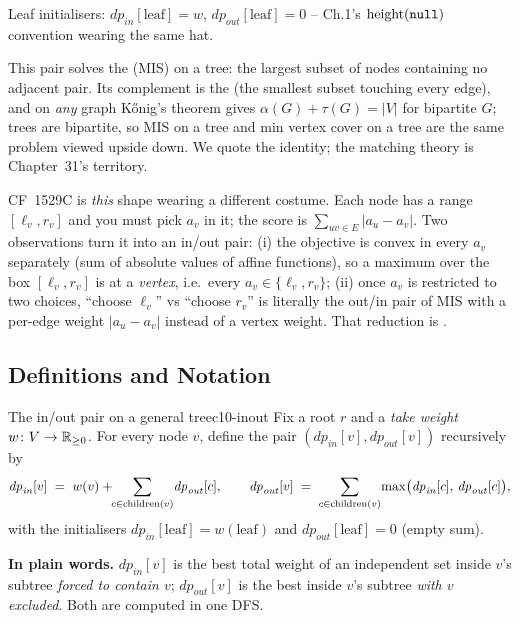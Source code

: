 Leaf initialisers: $\mathit{dp}_{\mathit{in}}[\text{leaf}]=w$,
$\mathit{dp}_{\mathit{out}}[\text{leaf}]=0$ -- Ch.1's $\operatorname{height}(\texttt{null})$
convention wearing the same hat.

This pair solves the  (MIS) on a tree: the
largest subset of nodes containing no adjacent pair. Its complement is the
 (the smallest subset touching every edge), and
on \emph{any} graph K{\H{o}}nig's theorem gives
$\alpha(G)+\tau(G)=|V|$ for bipartite $G$; trees are bipartite, so MIS on a
tree and min vertex cover on a tree are the same problem viewed upside
down. We quote the identity; the matching theory is Chapter~31's territory.

CF~1529C is \emph{this} shape wearing a different costume. Each node has a
range $[\ell_v,r_v]$ and you must pick $a_v$ in it; the score is
$\sum_{uv\in E}|a_u-a_v|$. Two observations turn it into an in/out pair:
(i) the objective is convex in every $a_v$ separately (sum of absolute
values of affine functions), so a maximum over the box $[\ell_v,r_v]$ is at
a \emph{vertex}, i.e.\ every $a_v\in\{\ell_v,r_v\}$; (ii) once $a_v$ is
restricted to two choices, ``choose $\ell_v$'' vs ``choose $r_v$'' is
literally the out/in pair of MIS with a per-edge weight $|a_u-a_v|$ instead
of a vertex weight. That reduction is .

\subsection{Definitions and Notation}

\begin{definition}{The in/out pair on a general tree}{c10-inout}
Fix a root $r$ and a \emph{take weight} $w\colon V\to\mathbb{R}_{\ge 0}$. For every
node $v$, define the pair $(\mathit{dp}_{\mathit{in}}[v],
\mathit{dp}_{\mathit{out}}[v])$ recursively by
\[
  \mathit{dp}_{\mathit{in}}[v] \;=\; w(v)+\!\!\sum_{c\in\operatorname{children}(v)}\!\mathit{dp}_{\mathit{out}}[c],
  \qquad
  \mathit{dp}_{\mathit{out}}[v] \;=\; \sum_{c\in\operatorname{children}(v)}\!\max\!\big(\mathit{dp}_{\mathit{in}}[c],\,\mathit{dp}_{\mathit{out}}[c]\big),
\]
with the initialisers $\mathit{dp}_{\mathit{in}}[\text{leaf}]=w(\text{leaf})$
and $\mathit{dp}_{\mathit{out}}[\text{leaf}]=0$ (empty sum).
\end{definition}

\noindent\textbf{In plain words.} $\mathit{dp}_{\mathit{in}}[v]$ is the best
total weight of an independent set inside $v$'s subtree \emph{forced to
contain $v$}; $\mathit{dp}_{\mathit{out}}[v]$ is the best inside $v$'s
subtree \emph{with $v$ excluded}. Both are computed in one DFS.

